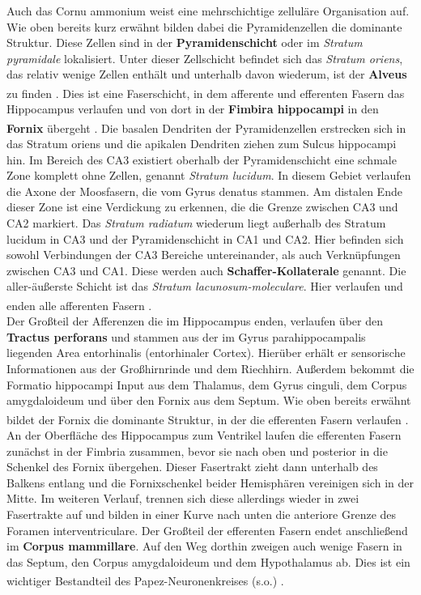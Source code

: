 Auch das Cornu ammonium weist eine mehrschichtige zelluläre Organisation auf. Wie oben bereits kurz erwähnt bilden dabei die Pyramidenzellen die dominante Struktur. Diese Zellen sind in der \textbf{Pyramidenschicht} oder im \textit{Stratum pyramidale} lokalisiert. Unter dieser Zellschicht befindet sich das \textit{Stratum oriens}, das relativ wenige Zellen enthält und unterhalb davon wiederum, ist der \textbf{Alveus} zu finden \textsuperscript{\cite[Kap.~20]{paxinos2014rat}}. Dies ist eine Faserschicht, in dem afferente und efferenten Fasern das Hippocampus verlaufen und von dort in der \textbf{Fimbira hippocampi} in den \textbf{Fornix}  übergeht \textsuperscript{\cite[Kap.~9]{trepel2011neuroanatomie}}. Die basalen Dendriten der Pyramidenzellen erstrecken sich in das Stratum oriens und die apikalen Dendriten ziehen zum Sulcus hippocampi hin. Im Bereich des CA3 existiert oberhalb der Pyramidenschicht eine schmale Zone komplett ohne Zellen, genannt \textit{Stratum lucidum}. In diesem Gebiet verlaufen die Axone der Moosfasern, die vom Gyrus denatus stammen. Am distalen Ende dieser Zone ist eine Verdickung zu erkennen, die die Grenze zwischen CA3 und CA2 markiert. Das \textit{Stratum radiatum} wiederum liegt außerhalb des Stratum lucidum in CA3 und der Pyramidenschicht in CA1 und CA2. Hier befinden sich sowohl Verbindungen der CA3 Bereiche untereinander, als auch Verknüpfungen zwischen CA3 und CA1. Diese werden auch \textbf{Schaffer-Kollaterale}  genannt. Die aller-äußerste Schicht ist das \textit{Stratum lacunosum-moleculare}. Hier verlaufen und enden alle afferenten Fasern \textsuperscript{\cite[Kap.~20]{paxinos2014rat}}.\\
Der Großteil der Afferenzen die im Hippocampus enden, verlaufen über den \textbf{Tractus perforans}  und stammen aus der im Gyrus parahippocampalis liegenden Area entorhinalis (entorhinaler Cortex). Hierüber erhält er sensorische Informationen aus der Großhirnrinde und dem Riechhirn. Außerdem bekommt die Formatio hippocampi Input aus dem Thalamus, dem Gyrus cinguli, dem Corpus amygdaloideum und über den Fornix aus dem Septum. Wie oben bereits erwähnt bildet der Fornix die dominante Struktur, in der die efferenten Fasern verlaufen \textsuperscript{\cite[Kap.~9]{trepel2011neuroanatomie}}. An der Oberfläche des Hippocampus zum Ventrikel laufen die efferenten Fasern zunächst in der Fimbria zusammen, bevor sie nach oben und posterior in die Schenkel des Fornix übergehen. Dieser Fasertrakt zieht dann unterhalb des Balkens entlang und die Fornixschenkel beider Hemisphären vereinigen sich in der Mitte. Im weiteren Verlauf, trennen sich diese allerdings wieder in zwei Fasertrakte auf und bilden in einer Kurve nach unten die anteriore Grenze des Foramen interventriculare. Der Großteil der efferenten Fasern endet anschließend im \textbf{Corpus mammillare}. Auf den Weg dorthin zweigen auch wenige Fasern in das Septum, den Corpus amygdaloideum und dem Hypothalamus ab. Dies ist ein wichtiger Bestandteil des Papez-Neuronenkreises (s.o.) \textsuperscript{\cite[Kap.~12]{crossman2014neuroanatomy}}.\\
